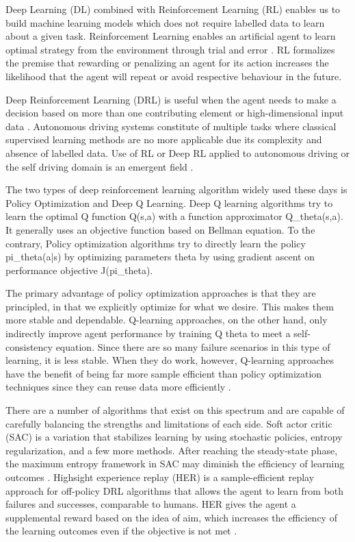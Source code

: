 \documentclass{svproc}
\begin{document}
Deep Learning (DL) combined with Reinforcement Learning (RL) enables us to build machine learning models which does not require labelled data to learn about a given task. Reinforcement Learning enables an artificial agent to learn optimal strategy from the environment through trial and error \cite{yu2010introduction}. RL formalizes the premise that rewarding or penalizing an agent for its action increases the likelihood that the agent will repeat or avoid respective behaviour in the future.

Deep Reinforcement Learning (DRL) is useful when the agent needs to make a decision based on more than one contributing element or high-dimensional input data \cite{arulkumaran2017deep}.  Autonomous driving systems constitute of multiple tasks where classical supervised learning methods are no more applicable due its complexity and absence of labelled data.  Use of RL or Deep RL applied to autonomous driving or the self driving domain is an emergent field \cite{sainath2021application}.

The two types of deep reinforcement learning algorithm widely used these days is Policy Optimization and Deep Q Learning. Deep Q learning algorithms try to learn the optimal Q function Q(s,a) with a function approximator Q\_theta(s,a). It generally uses an objective function based on Bellman equation. To the contrary, Policy optimization algorithms try to directly learn the policy pi\_theta(a|s) by optimizing parameters theta by using gradient ascent on performance objective J(pi\_theta). 

The primary advantage of policy optimization approaches is that they are principled, in that we explicitly optimize for what we desire. This makes them more stable and dependable. Q-learning approaches, on the other hand, only indirectly improve agent performance by training Q theta to meet a self-consistency equation. Since there are so many failure scenarios in this type of learning, it is less stable. When they do work, however, Q-learning approaches have the benefit of being far more sample efficient than policy optimization techniques since they can reuse data more efficiently \cite{yang2020nature}. 

There are a number of algorithms that exist on this spectrum and are capable of carefully balancing the strengths and limitations of each side. Soft actor critic (SAC) \cite{sloss20202019} is a variation that stabilizes learning by using stochastic policies, entropy regularization, and a few more methods. After reaching the steady-state phase, the maximum entropy framework in SAC may diminish the efﬁciency of learning outcomes \cite{simon2013evolutionary}.  Highsight experience replay (HER) is a sample-efficient replay approach for off-policy DRL algorithms that allows the agent to learn from both failures and successes, comparable to humans. HER gives the agent a supplemental reward based on the idea of aim, which increases the efficiency of the learning outcomes even if the objective is not met \cite{simon2013evolutionary}.
\end{document}

